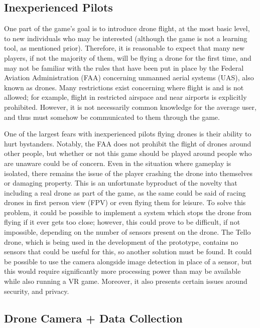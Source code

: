 \documentclass[10pt,twocolumn]{article}
\begin{document}
\subsection{Inexperienced Pilots}
One part of the game's goal is to introduce drone flight, at the most basic level, to new individuals who may be interested (although the game is not a learning tool, as mentioned prior). Therefore, it is reasonable to expect that many new players, if not the majority of them, will be flying a drone for the first time, and may not be familiar with the rules that have been put in place by the Federal Aviation Administration (FAA) concerning unmanned aerial systems (UAS), also known as drones. Many restrictions exist concerning where flight is and is not allowed; for example, flight in restricted airspace and near airports is explicitly prohibited\cite{DronesFAA}. However, it is not necessarily common knowledge for the average user, and thus must somehow be communicated to them through the game.

One of the largest fears with inexperienced pilots flying drones is their ability to hurt bystanders. Notably, the FAA does not prohibit the flight of drones around other people, but whether or not this game should be played around people who are unaware could be of concern. Even in the situation where gameplay is isolated, there remains the issue of the player crashing the drone into themselves or damaging property. This is an unfortunate byproduct of the novelty that including a real drone as part of the game, as the same could be said of racing drones in first person view (FPV) or even flying them for leisure. To solve this problem, it could be possible to implement a system which stops the drone from flying if it ever gets too close; however, this could prove to be difficult, if not impossible, depending on the number of sensors present on the drone. The Tello drone, which is being used in the development of the prototype, contains no sensors that could be useful for this, so another solution must be found. It could be possible to use the camera alongside image detection in place of a sensor, but this would require significantly more processing power than may be available while also running a VR game. Moreover, it also presents certain issues around security, and privacy.



\subsection{Drone Camera + Data Collection}
\end{document}

